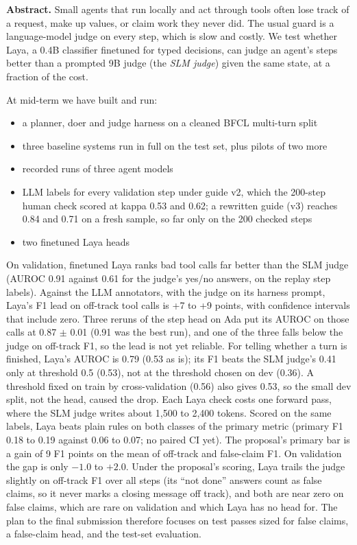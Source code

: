 \documentclass[10.5pt,a4paper]{article}
\begin{document}
\begin{tcolorbox}[colback=shade,colframe=rule,boxrule=0.6pt,arc=1pt,left=8pt,right=8pt,top=5pt,bottom=5pt,fontupper=\small]
\textbf{Abstract.} Small agents that run locally and act through tools often lose track of a request, make up values, or claim work they never did. The usual guard is a language-model judge on every step, which is slow and costly. We test whether Laya, a 0.4B classifier finetuned for typed decisions, can judge an agent's steps better than a prompted 9B judge (the \emph{SLM judge}) given the same state, at a fraction of the cost.\par\smallskip
At mid-term we have built and run:
\begin{itemize}
  \item a planner, doer and judge harness on a cleaned BFCL multi-turn split
  \item three baseline systems run in full on the test set, plus pilots of two more
  \item recorded runs of three agent models
  \item LLM labels for every validation step under guide v2, which the 200-step human check scored at kappa 0.53 and 0.62; a rewritten guide (v3) reaches 0.84 and 0.71 on a fresh sample, so far only on the 200 checked steps
  \item two finetuned Laya heads
\end{itemize}
\smallskip
On validation, finetuned Laya ranks bad tool calls far better than the SLM judge (AUROC 0.91 against 0.61 for the judge's yes/no answers, on the replay step labels). Against the LLM annotators, with the judge on its harness prompt, Laya's F1 lead on off-track tool calls is +7 to +9 points, with confidence intervals that include zero. Three reruns of the step head on Ada put its AUROC on those calls at 0.87 $\pm$ 0.01 (0.91 was the best run), and one of the three falls below the judge on off-track F1, so the lead is not yet reliable. For telling whether a turn is finished, Laya's AUROC is 0.79 (0.53 as is); its F1 beats the SLM judge's 0.41 only at threshold 0.5 (0.53), not at the threshold chosen on dev (0.36). A threshold fixed on train by cross-validation (0.56) also gives 0.53, so the small dev split, not the head, caused the drop. Each Laya check costs one forward pass, where the SLM judge writes about 1,500 to 2,400 tokens. Scored on the same labels, Laya beats plain rules on both classes of the primary metric (primary F1 0.18 to 0.19 against 0.06 to 0.07; no paired CI yet). The proposal's primary bar is a gain of 9 F1 points on the mean of off-track and false-claim F1. On validation the gap is only $-1.0$ to $+2.0$. Under the proposal's scoring, Laya trails the judge slightly on off-track F1 over all steps (its ``not done'' answers count as false claims, so it never marks a closing message off track), and both are near zero on false claims, which are rare on validation and which Laya has no head for. The plan to the final submission therefore focuses on test passes sized for false claims, a false-claim head, and the test-set evaluation.
\end{tcolorbox}
\end{document}
